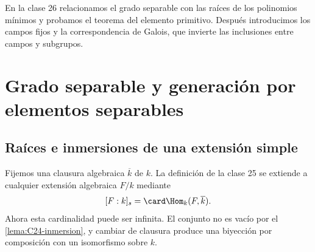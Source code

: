 En la clase 26 relacionamos el grado separable con las raíces de los polinomios mínimos y probamos el teorema del elemento primitivo. Después introducimos los campos fijos y la correspondencia de Galois, que invierte las inclusiones entre campos y subgrupos.

\section{Grado separable y generación por elementos separables}
\subsection{Raíces e inmersiones de una extensión simple}
Fijemos una clausura algebraica $\overline k$ de $k$. La definición de la clase 25 se extiende a cualquier extensión algebraica $F/k$ mediante
\[
[F:k]_s=\card\Hom_k(F,\overline k).
\]
Ahora esta cardinalidad puede ser infinita. El conjunto no es vacío por el \cref{lema:C24-inmersion}, y cambiar de clausura produce una biyección por composición con un isomorfismo sobre $k$.

